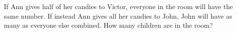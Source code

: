 If Ann gives half of her candies to Victor, everyone in the room will have the same number. If instead Ann gives all her candies to John, John will have as many as everyone else combined. How many children are in the room?
